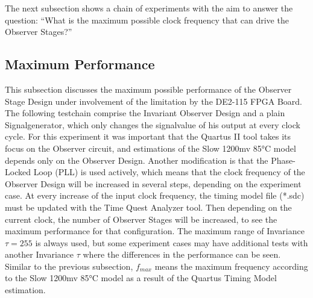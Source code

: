 The next subsection shows a chain of experiments with the aim to answer the question: ``What is the maximum possible clock frequency that can drive the Observer Stages?''

\subsection{Maximum Performance}
\label{chapter:4:section:3:subsection:2}
This subsection discusses the maximum possible performance of the Observer Stage Design under involvement of the limitation by the DE2-115 FPGA Board. 
The following testchain comprise the Invariant Observer Design and a plain Signalgenerator, which only changes the signalvalue of his output at every clock cycle. 
For this experiment it was important that the Quartus II tool takes its focus on the Observer circuit, and estimations of the Slow 1200mv 85°C model depends 
only on the Observer Design.
Another modification is that the Phase-Locked Loop (PLL) is used actively, which means that the clock frequency of the Observer Design will be increased in several steps, 
depending on the experiment case. 
At every increase of the input clock frequency, the timing model file (*.sdc) must be updated with the Time Quest Analyzer tool. 
Then depending on the current clock, the number of Observer Stages will be increased, to see the maximum performance for that configuration. 
The maximum range of Invariance $\tau = 255$ is always used, but some experiment cases may have additional tests with another Invariance $\tau$ 
where the differences in the performance can be seen. 
Similar to the previous subsection, $f_{max}$ means the maximum frequency according to the Slow 1200mv 85°C model as a result of the Quartus Timing Model estimation. \\

